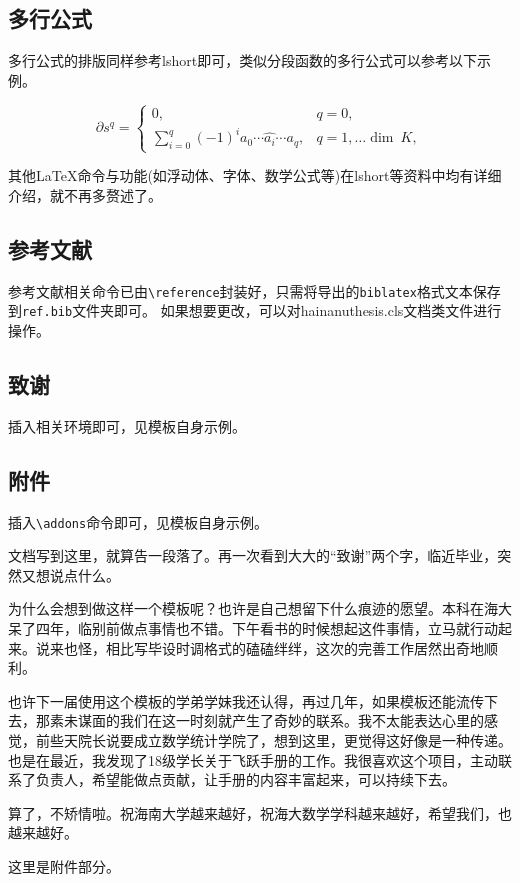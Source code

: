 \documentclass{hainanuthesis}
\theoremstyle{definition}
\begin{document}
	\subsection{多行公式}
	
	多行公式的排版同样参考lshort即可，类似分段函数的多行公式可以参考以下示例。
	
	\[\partial s^q = \left\{
		\begin{array}{ll}
			0, & q=0,\\
			\sum\limits_{i=0}^q(-1)^i a_0\cdots \hat{a_i}\cdots a_q, &  q = 1,\dots \mathop{dim}~K,
		\end{array} \right. 
	\]
	
	其他\LaTeX 命令与功能(如浮动体、字体、数学公式等)在lshort等资料中均有详细介绍，就不再多赘述了。
	
	\subsection{参考文献}
	
	参考文献相关命令已由\verb|\reference|封装好，只需将导出的\verb|biblatex|格式文本保存到\verb|ref.bib|文件夹即可。
	如果想要更改，可以对hainanuthesis.cls文档类文件进行操作。
	\subsection{致谢}
	插入相关环境即可，见模板自身示例。
	
	
	
	\subsection{附件}
	
	插入\verb|\addons|命令即可，见模板自身示例。
	
	
	\newpage
	\begin{acknowledge}
		文档写到这里，就算告一段落了。再一次看到大大的“致谢”两个字，临近毕业，突然又想说点什么。
		
		为什么会想到做这样一个模板呢？也许是自己想留下什么痕迹的愿望。本科在海大呆了四年，临别前做点事情也不错。下午看书的时候想起这件事情，立马就行动起来。说来也怪，相比写毕设时调格式的磕磕绊绊，这次的完善工作居然出奇地顺利。
		
		也许下一届使用这个模板的学弟学妹我还认得，再过几年，如果模板还能流传下去，那素未谋面的我们在这一时刻就产生了奇妙的联系。我不太能表达心里的感觉，前些天院长说要成立数学统计学院了，想到这里，更觉得这好像是一种传递。也是在最近，我发现了18级学长关于飞跃手册的工作。我很喜欢这个项目，主动联系了负责人，希望能做点贡献，让手册的内容丰富起来，可以持续下去。
		
		算了，不矫情啦。祝海南大学越来越好，祝海大数学学科越来越好，希望我们，也越来越好。
	\end{acknowledge}
	
	\newpage
	
	\newpage
	\addons
	这里是附件部分。
	
	
	
	
\end{document}
